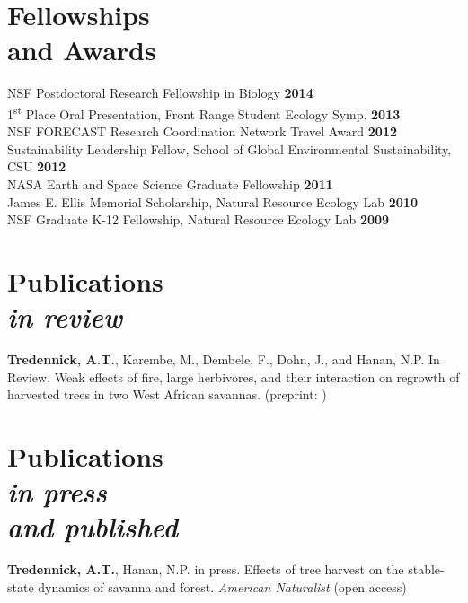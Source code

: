 \documentclass[margin,line]{resume}
\begin{document}
\begin{resume}
    \section{\mysidestyle Fellowships \\and Awards} 
                NSF Postdoctoral Research Fellowship in Biology    \hfill \textbf{2014}\vspace{.5mm}\\%
                1\textsuperscript{st} Place Oral Presentation, Front Range Student Ecology Symp.  \hfill \textbf{2013}\vspace{.5mm}\\%
                NSF FORECAST Research Coordination Network Travel Award \hfill \textbf{2012}\vspace{.5mm}\\%
                Sustainability Leadership Fellow, School of Global Environmental Sustainability, CSU \hfill \textbf{2012}\vspace{.5mm}\\%
		NASA Earth and Space Science Graduate Fellowship  \hfill \textbf{2011}\vspace{.5mm}\\%
		James E. Ellis Memorial Scholarship, Natural Resource Ecology Lab  \hfill \textbf{2010}\vspace{.5mm}\\%
		NSF Graduate K-12 Fellowship, Natural Resource Ecology Lab                        \hfill\textbf{2009}%
   
     \section{\mysidestyle Publications\\ \textsl{\footnotesize in review}}
        \textbf{Tredennick, A.T.}, Karembe, M., Dembele, F., Dohn, J., and Hanan, N.P. In Review. Weak effects of fire, large herbivores, and their interaction on regrowth of harvested trees in two West African savannas. (preprint: )
        
    \section{\mysidestyle Publications\\ \textsl{\footnotesize in press}\\ \textsl{\footnotesize and published}}     
     	\textbf{Tredennick, A.T.}, Hanan, N.P. in press. Effects of tree harvest on the stable-state dynamics of savanna and forest. \textsl{American Naturalist} (open access) \vspace{-6mm} \\%
	

\end{resume}
\end{document}
